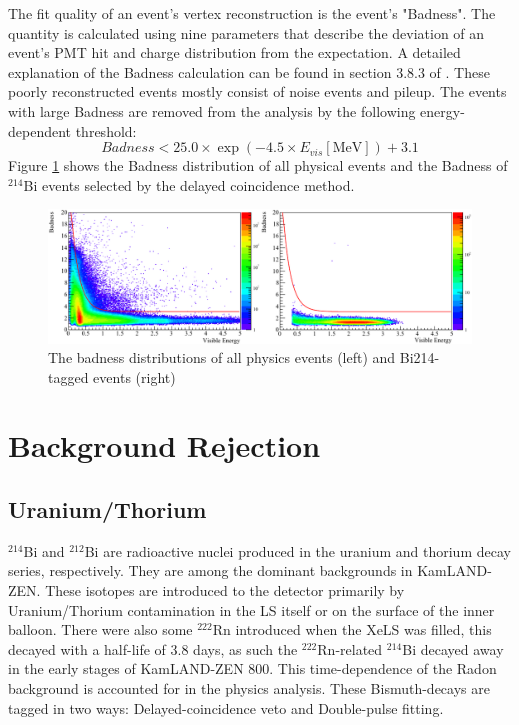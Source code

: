 \begin{enumerate}
	The fit quality of an event's vertex reconstruction is the event's "Badness". The quantity is calculated using nine parameters that describe the deviation of an event's PMT hit and charge distribution from the expectation. A detailed explanation of the Badness calculation can be found in section 3.8.3 of \cite{}. These poorly reconstructed events mostly consist of noise events and pileup. The events with large Badness are removed from the analysis by the following energy-dependent threshold:
	\begin{equation}
		Badness < 25.0\times \exp(-4.5\times E_{vis} [\mathrm{MeV}]) + 3.1
	\end{equation}
	Figure \ref{fig:badness} shows the Badness distribution of all physical events and the Badness of $^{214}$Bi events selected by the delayed coincidence method.
	\begin{figure}[htb]
		\centering
        \includegraphics[scale=0.45]{badness.png}
        \caption{The badness distributions of all physics events (left) and Bi214-tagged events (right)}
        \label{fig:badness}
	\end{figure}
\end{enumerate}

\section{Background Rejection}
\subsection{Uranium/Thorium}
$^{214}$Bi and $^{212}$Bi are radioactive nuclei produced in the uranium and thorium decay series, respectively. They are among the dominant backgrounds in KamLAND-ZEN. These isotopes are introduced to the detector primarily by Uranium/Thorium contamination in the LS itself or on the surface of the inner balloon. There were also some $^{222}$Rn introduced when the XeLS was filled, this decayed with a half-life of 3.8 days, as such the $^{222}$Rn-related $^{214}$Bi decayed away in the early stages of KamLAND-ZEN 800. This time-dependence of the Radon background is accounted for in the physics analysis.
These Bismuth-decays are tagged in two ways: Delayed-coincidence veto and Double-pulse fitting.
